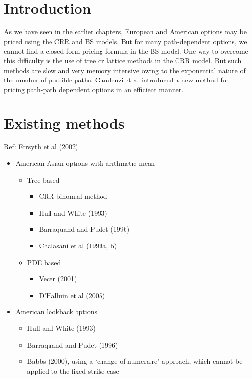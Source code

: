 \section{Introduction}
\label{sec:intro}
As we have seen in the earlier chapters, European and American options may be priced using the CRR and BS models. But for many path-dependent options, we cannot find a closed-form pricing formula in the BS model. One way to overcome this difficulty is the use of tree or lattice methods in the CRR model. But such methods are slow and very memory intensive owing to the exponential nature of the number of possible paths. Gaudenzi et al\cite{Gaudenzi2010} introduced a new method for pricing path-path dependent options in an efficient manner.


\section{Existing methods}
\label{sec:existing-methods}
Ref: Forsyth et al (2002)
\begin{itemize}
\item American Asian options with arithmetic mean
  \begin{itemize}
  \item Tree based
    \begin{itemize}
    \item CRR binomial method
    \item Hull and White (1993)
    \item Barraquand and Pudet (1996)
    \item Chalasani et al (1999a, b)
    \end{itemize}
  \item PDE based
    \begin{itemize}
    \item Vecer (2001)
    \item D’Halluin et al (2005)
    \end{itemize}
  \end{itemize}
\item American lookback options
  \begin{itemize}
  \item Hull and White (1993)
  \item Barraquand and Pudet (1996)
  \item Babbs (2000), using a `change of numeraire' approach, which cannot be applied to the fixed-strike case
  \end{itemize}
\end{itemize}


